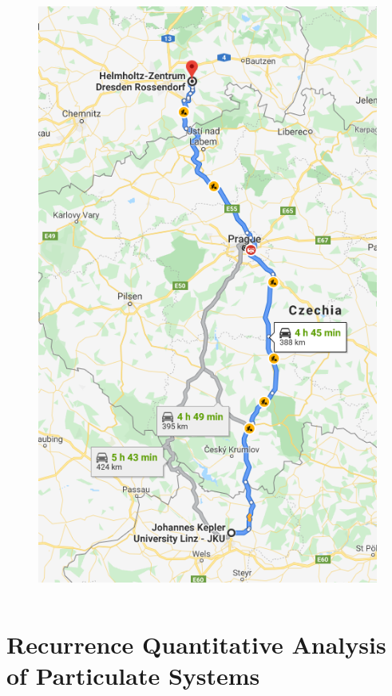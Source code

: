 \documentclass[9pt, english]{beamer}
\begin{document}
\begin{frame}
\begin{columns}[t]
\begin{column}{0.35\textwidth}
\begin{figure}
\includegraphics[width=1.0\textwidth]{route_jku_hzdr.png}
\end{figure}
\end{column}
\end{columns}
\end{frame}

%
%

\section{Recurrence Quantitative Analysis of Particulate Systems}
\end{document}
